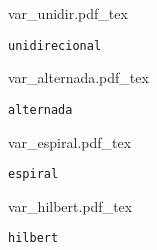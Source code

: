 \begin{subfigure}{0.24\textwidth}
    \centering
    \def\svgwidth{3cm}
    {var_unidir.pdf_tex}
    \caption{\texttt{unidirecional}}
    \label{fig:varredura:unidirecional}
\end{subfigure}%
\begin{subfigure}{0.24\textwidth}
    \centering
    \def\svgwidth{3cm}
    {var_alternada.pdf_tex}
    \caption{\texttt{alternada}}
    \label{fig:varredura:alternada}
\end{subfigure}%
\begin{subfigure}{0.24\textwidth}
    \centering
    \def\svgwidth{3cm}
    {var_espiral.pdf_tex}
    \caption{\texttt{espiral}}
    \label{fig:varredura:espiral}
\end{subfigure}%
\begin{subfigure}{0.24\textwidth}
    \centering
    \def\svgwidth{3cm}
    {var_hilbert.pdf_tex}
    \caption{\texttt{hilbert}}
    \label{fig:varredura:hilber}
\end{subfigure}